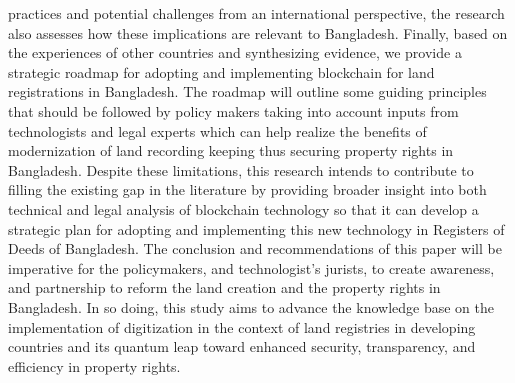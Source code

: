 \documentclass[conference]{IEEEtran}
\begin{document}
practices and potential challenges from an international perspective, the research also assesses how these implications are relevant to Bangladesh. Finally, based on the experiences of other countries and synthesizing evidence, we provide a strategic roadmap for adopting and implementing blockchain for land registrations in Bangladesh. The roadmap will outline some guiding principles that should be followed by policy makers taking into account inputs from technologists and legal experts which can help realize the benefits of modernization of land recording keeping thus securing property rights in Bangladesh. Despite these limitations, this research intends to contribute to filling the existing gap in the literature by providing broader insight into both technical and legal analysis of blockchain technology so that it can develop a strategic plan for adopting and implementing this new technology in Registers of Deeds of Bangladesh. The conclusion and recommendations of this paper will be imperative for the policymakers, and technologist’s jurists, to create awareness, and partnership to reform the land creation and the property rights in Bangladesh. In so doing, this study aims to advance the knowledge base on the implementation of digitization in the context of land registries in developing countries and its quantum leap toward enhanced security, transparency, and efficiency in property rights.
\end{document}
